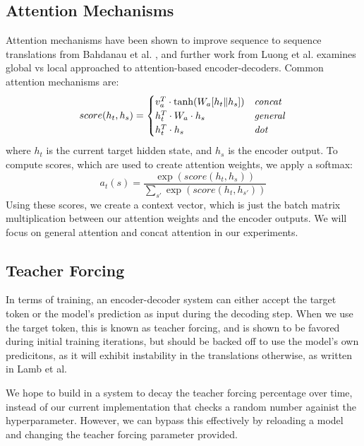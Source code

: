 \documentclass[twoside,twocolumn]{article}
\begin{document}
\subsection{Attention Mechanisms}
Attention mechanisms have been shown to improve sequence to sequence
translations from Bahdanau et al. \cite{bahdanau2014neural}, and further work
from Luong et al. \cite{luong2015effective} examines global vs local approached
to attention-based encoder-decoders. Common attention mechanisms are:
\begin{equation}
    score(h_t, h_s) =
    \begin{cases}
        v_a^T \cdot \tanh (W_a [h_t \| h_s]) & \text{\emph{concat}} \\
        h_t^T \cdot W_a \cdot h_s & \text{\emph{general}} \\
        h_t^T \cdot h_s & \text{\emph{dot}} \\
    \end{cases}
\end{equation}
where $h_t$ is the current target hidden state, and $h_s$ is the encoder output.
To compute scores, which are used to create attention weights, we apply a
softmax:
\begin{equation}
  a_t(s) = \frac{\exp(score(h_t, h_s))}{\sum_{s'}\exp(score(h_t, h_{s'}))}
\end{equation}
Using these scores, we create a context vector, which is just the batch matrix
multiplication between our attention weights and the encoder outputs.
We will focus on general attention and concat attention in our
experiments.

\subsection{Teacher Forcing}
In terms of training, an encoder-decoder system can either accept the target
token or the model's prediction as input during the decoding step. When we use
the target token, this is known as teacher forcing, and is shown to be favored
during initial training iterations, but should be backed off to use the
model's own predicitons, as it will exhibit instability in the translations
otherwise, as written in Lamb et al. \cite{lamb2016professor}

We hope to build in a system to decay the teacher forcing percentage over time,
instead of our current implementation that checks a random number againist the
hyperparameter. However, we can bypass this effectively by reloading a model
and changing the teacher forcing parameter provided.
\end{document}
